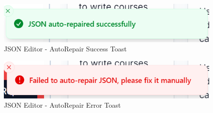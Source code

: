 \begin{figure}[h]
    \centering
    \includegraphics[scale=1]{images/json-editor-autorepair-success.png}
    \caption{JSON Editor - AutoRepair Success Toast}
    \label{fig:json-editor-autorepair-success}
\end{figure}

\begin{figure}[hbt!]
    \centering
    \includegraphics[scale=1]{images/json-editor-autorepair-error.png}
    \caption{JSON Editor - AutoRepair Error Toast}
    \label{fig:json-editor-autorepair-error}
\end{figure}

